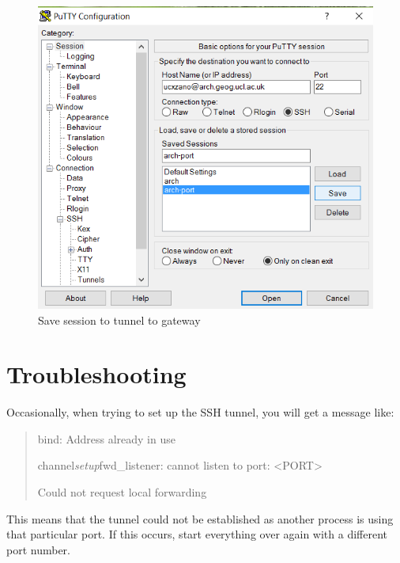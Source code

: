\documentclass[a4paper]{article}
\newenvironment{ttt}{\ttfamily}{\par} %
\begin{document}
\begin{figure}[p]
  \centering
    \includegraphics[width=\textwidth]{figures/putty3_save_tunnel_session.png}
  \caption{Save session to tunnel to gateway}
  \label{fig:putty3}
\end{figure}

\section{Troubleshooting}
\label{sec:trouble}
Occasionally, when trying to set up the SSH tunnel, you will get a message like:
\begin{quote}
\begin{ttt}
bind: Address already in use

channel\emph{setup}fwd\_listener: cannot listen to port: \textless{}PORT\textgreater{}

Could not request local forwarding
\end{ttt}
\end{quote}

This means that the tunnel could not be established as another process is using that particular port.
If this occurs, start everything over again with a different port number.

\newpage


\end{document}
